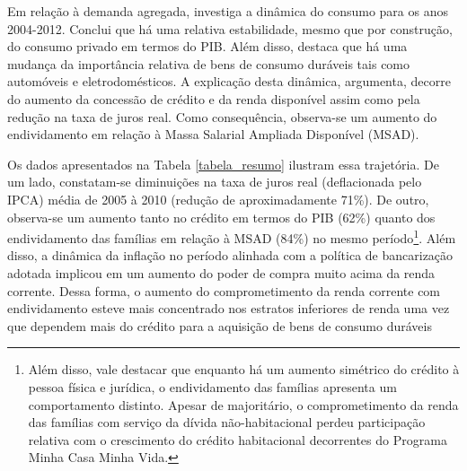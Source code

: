 Em relação à demanda agregada, \textcite{dos_santos_notas_2013} investiga a dinâmica do consumo para os anos 2004-2012. Conclui que há uma relativa estabilidade, mesmo que por construção, do consumo privado em termos do PIB. Além disso, destaca que há uma mudança da importância relativa de bens de consumo duráveis tais como automóveis e eletrodomésticos. A explicação desta dinâmica, argumenta, decorre do aumento da concessão de crédito e da renda disponível assim como pela redução na taxa de juros real. Como consequência, observa-se um aumento do endividamento em relação à Massa Salarial Ampliada Disponível (MSAD). 

Os dados apresentados na Tabela \ref{tabela_resumo} ilustram essa trajetória. De um lado, constatam-se diminuições na taxa de juros real (deflacionada pelo IPCA) média de 2005 à 2010 (redução de aproximadamente 71\%). De outro, observa-se um aumento tanto no crédito em termos do PIB (62\%) quanto dos endividamento das famílias em relação à MSAD (84\%) no mesmo período\footnote{Além disso, vale destacar que enquanto há um aumento simétrico do crédito à pessoa física e jurídica, o endividamento das famílias apresenta um comportamento distinto. Apesar de majoritário, o comprometimento da renda das famílias com serviço da dívida não-habitacional perdeu participação relativa com o crescimento do crédito habitacional decorrentes do Programa Minha Casa Minha Vida.}. Além disso, a dinâmica da inflação no período alinhada com a política de bancarização adotada implicou em um aumento do poder de compra muito acima da renda corrente. Dessa forma, o aumento do comprometimento da renda corrente com endividamento esteve mais concentrado nos estratos inferiores de renda uma vez que dependem mais do crédito para a aquisição de bens de consumo duráveis \cite[p.~387-9]{dedecca_reducao_2014} 

